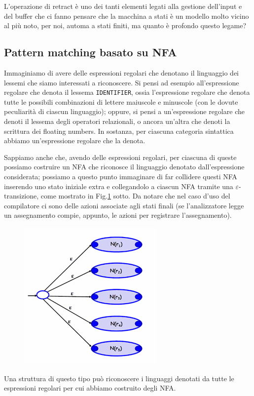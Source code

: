 \documentclass[class=book, crop=false, oneside, 12pt]{standalone}
\begin{document}
L'operazione di retract è uno dei tanti elementi legati alla gestione dell'input e del buffer che ci fanno pensare che la macchina a stati è un modello molto vicino al più noto, per noi, automa a stati finiti, ma quanto è profondo questo legame?

\subsection{Pattern matching basato su NFA}
Immaginiamo di avere delle espressioni regolari che denotano il linguaggio dei lessemi che siamo interessati a riconoscere. Si pensi ad esempio all'espressione regolare che denota il lessema \texttt{IDENTIFIER}, ossia l'espressione regolare che denota tutte le possibili combinazioni di lettere maiuscole e minuscole (con le dovute peculiarità di ciascun linguaggio); oppure, si pensi a un'espressione regolare che denoti il lessema degli operatori relazionali, o ancora un'altra che denoti la scrittura dei floating numbers. In sostanza, per ciascuna categoria sintattica abbiamo un'espressione regolare che la denota.

Sappiamo anche che, avendo delle espressioni regolari, per ciascuna di queste possiamo costruire un NFA che riconosce il linguaggio denotato dall'espressione considerata; possiamo a questo punto immaginare di far collidere questi NFA inserendo uno stato iniziale extra e collegandolo a ciascun NFA tramite una \(\varepsilon\)-transizione, come mostrato in Fig.\ref{nfa_for_grammar_regular_expressions} sotto.
Da notare che nel caso d'uso del compilatore ci sono delle azioni associate agli stati finali (se l'analizzatore legge un assegnamento compie, appunto, le azioni per registrare l'assegnamento).
\begin{figure}[H]
    \centering
    \includegraphics[width=.4\textwidth,keepaspectratio]{lec-14-2.png}
    \caption{}
    \label{nfa_for_grammar_regular_expressions}
\end{figure}
Una struttura di questo tipo può riconoscere i linguaggi denotati da tutte le espressioni regolari per cui abbiamo costruito degli NFA. 
\end{document}
